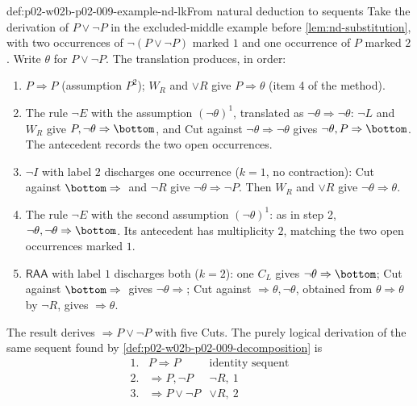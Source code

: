 \begin{hbexample}{def:p02-w02b-p02-009-example-nd-lk}{From natural deduction to sequents}
Take the derivation of \(P\lor\neg P\) in the excluded-middle example
before \cref{lem:nd-substitution}, with two occurrences of
\(\neg(P\lor\neg P)\) marked \(1\) and one occurrence of \(P\) marked \(2\).
Write \(\theta\) for \(P\lor\neg P\).  The translation produces, in order:
\begin{enumerate}
  \item \(P\Rightarrow P\) (assumption \(P^{2}\)); \(W_R\) and \(\lor R\)
    give \(P\Rightarrow\theta\) (item 4 of the method).
  \item The rule \(\neg E\) with the assumption \((\neg\theta)^{1}\),
    translated as \(\neg\theta\Rightarrow\neg\theta\): \(\neg L\) and
    \(W_R\) give \(P,\neg\theta\Rightarrow\bottom\), and Cut against
    \(\neg\theta\Rightarrow\neg\theta\) gives
    \(\neg\theta,P\Rightarrow\bottom\).  The antecedent records the two
    open occurrences.
  \item \(\neg I\) with label \(2\) discharges one occurrence (\(k=1\), no
    contraction): Cut against \(\bottom\Rightarrow{}\) and \(\neg R\) give
    \(\neg\theta\Rightarrow\neg P\).  Then \(W_R\) and \(\lor R\) give
    \(\neg\theta\Rightarrow\theta\).
  \item The rule \(\neg E\) with the second assumption \((\neg\theta)^{1}\):
    as in step 2, \(\neg\theta,\neg\theta\Rightarrow\bottom\).  Its
    antecedent has multiplicity \(2\), matching the two open occurrences
    marked \(1\).
  \item \(\mathsf{RAA}\) with label \(1\) discharges both (\(k=2\)): one
    \(C_L\) gives \(\neg\theta\Rightarrow\bottom\); Cut against
    \(\bottom\Rightarrow{}\) gives \(\neg\theta\Rightarrow{}\); Cut against
    \({}\Rightarrow\theta,\neg\theta\), obtained from
    \(\theta\Rightarrow\theta\) by \(\neg R\), gives \({}\Rightarrow\theta\).
\end{enumerate}
The result derives \({}\Rightarrow P\lor\neg P\) with five Cuts.  The
purely logical derivation of the same sequent found by
\cref{def:p02-w02b-p02-009-decomposition} is
\[
\begin{array}{rll}
1.&P\Rightarrow P&\text{identity sequent}\\
2.&{}\Rightarrow P,\neg P&\neg R,\ 1\\
3.&{}\Rightarrow P\lor\neg P&\lor R,\ 2
\end{array}
\]
\end{hbexample}

